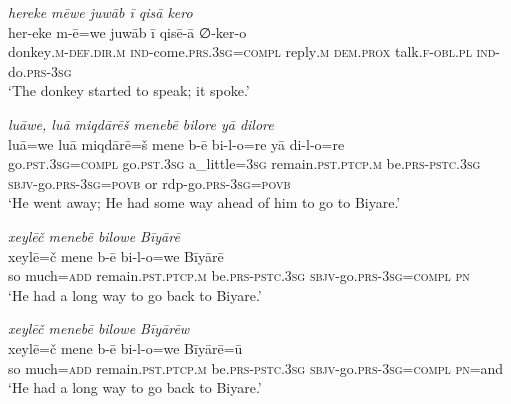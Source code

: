 \ea \label{HB.44}
\textit{hereke mēwe juwāb ī qisā kero} \\ 
\gll her-eke m-ē=we juwāb ī qisē-ā ∅-ker-o \\ 
 donkey\textsc{.m}\textsc{-def}\textsc{.dir}\textsc{.m} \textsc{ind-}come\textsc{.prs}\textsc{.3sg}\textsc{=compl} reply\textsc{.m} \textsc{dem.prox} talk\textsc{\textsc{.f}}\textsc{-obl}\textsc{.pl} \textsc{ind-}do\textsc{.prs}\textsc{-3sg} \\ 
\glt `The donkey started to speak; it spoke.'
\z 
 
\ea \label{HB.64}
\textit{luāwe, luā miqdārēš menebē bilore yā dilore} \\ 
\gll luā=we luā miqdārē=š mene b-ē bi-l-o=re yā di-l-o=re \\ 
 go\textsc{.pst}\textsc{.3sg}\textsc{=\textsc{compl}} go\textsc{.pst}\textsc{.3sg} a\_little\textsc{=3sg} remain\textsc{.pst}\textsc{.ptcp}\textsc{.m} be\textsc{.prs}\textsc{-pstc}\textsc{.3sg} \textsc{sbjv-}go\textsc{.prs}\textsc{-3sg}\textsc{=\textsc{povb}} or rdp-go\textsc{.prs}\textsc{-3sg}\textsc{=\textsc{povb}} \\ 
\glt `He went away; He had some way ahead of him to go to Biyare.'
\z 
 
\ea \label{HB.65}
\textit{xeylēč menebē bilowe Bīyārē} \\ 
\gll xeylē=č mene b-ē bi-l-o=we Bīyārē \\ 
 so much\textsc{=add} remain\textsc{.pst}\textsc{.ptcp}\textsc{.m} be\textsc{.prs}\textsc{-pstc}\textsc{.3sg} \textsc{sbjv-}go\textsc{.prs}\textsc{-3sg}\textsc{=\textsc{compl}} \textsc{pn} \\ 
\glt `He had a long way to go back to Biyare.'
\z 
 
\ea \label{HB.66}
\textit{xeylēč menebē bilowe Bīyārēw} \\ 
\gll xeylē=č mene b-ē bi-l-o=we Bīyārē=ū \\ 
 so much\textsc{=add} remain\textsc{.pst}\textsc{.ptcp}\textsc{.m} be\textsc{.prs}\textsc{-pstc}\textsc{.3sg} \textsc{sbjv-}go\textsc{.prs}\textsc{-3sg}\textsc{=\textsc{compl}} \textsc{pn}=and \\ 
\glt `He had a long way to go back to Biyare.'
\z 
 
